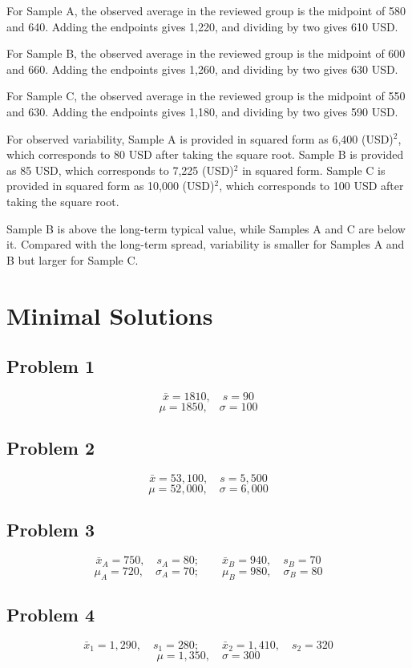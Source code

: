 \begin{ExamProblems}
		For Sample A, the observed average in the reviewed group is the midpoint of 580 and 640.
		Adding the endpoints gives 1,220, and dividing by two gives 610 USD.

		For Sample B, the observed average in the reviewed group is the midpoint of 600 and 660.
		Adding the endpoints gives 1,260, and dividing by two gives 630 USD.

		For Sample C, the observed average in the reviewed group is the midpoint of 550 and 630.
		Adding the endpoints gives 1,180, and dividing by two gives 590 USD.

		For observed variability, Sample A is provided in squared form as 6,400 (USD)$^2$, which corresponds to 80 USD after taking the square root.
		Sample B is provided as 85 USD, which corresponds to 7,225 (USD)$^2$ in squared form.
		Sample C is provided in squared form as 10,000 (USD)$^2$, which corresponds to 100 USD after taking the square root.

		Sample B is above the long-term typical value, while Samples A and C are below it.
		Compared with the long-term spread, variability is smaller for Samples A and B but larger for Sample C.


		\end{ExamProblems}

\section{Minimal Solutions}
\subsection*{Problem 1}
\[
\bar{x} = 1810,\quad s = 90
\]
\[
\mu = 1850,\quad \sigma = 100
\]

\subsection*{Problem 2}
\[
\bar{x} = 53,100,\quad s = 5,500
\]
\[
\mu = 52,000,\quad \sigma = 6,000
\]

\subsection*{Problem 3}
\[
\bar{x}_{A} = 750,\quad s_{A} = 80;\qquad \bar{x}_{B} = 940,\quad s_{B} = 70
\]
\[
\mu_{A} = 720,\quad \sigma_{A} = 70;\qquad \mu_{B} = 980,\quad \sigma_{B} = 80
\]

\subsection*{Problem 4}
\[
\bar{x}_{1} = 1,290,\quad s_{1} = 280;\qquad \bar{x}_{2} = 1,410,\quad s_{2} = 320
\]
\[
\mu = 1,350,\quad \sigma = 300
\]

